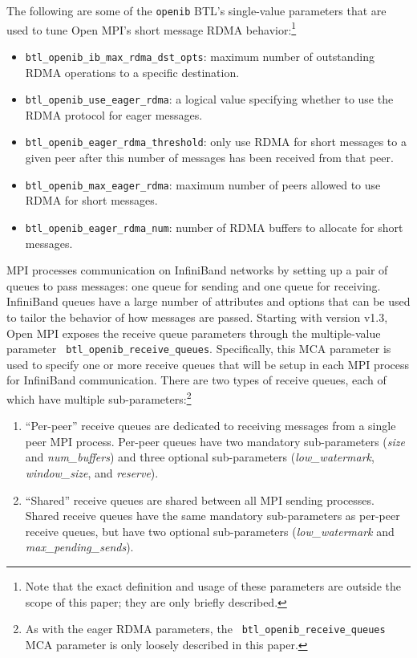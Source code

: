 The following are some of the {\tt openib} BTL's single-value
parameters that are used to tune Open MPI's short message RDMA
behavior:\footnote{Note that the exact definition and usage of these
  parameters are outside the scope of this paper; they are only
  briefly described.}

\begin{itemize}
\item {\tt btl\_\-openib\_\-ib\_\-max\_\-rdma\_\-dst\_\-opts}: maximum
  number of outstanding RDMA operations to a specific destination.
\item {\tt btl\_\-openib\_\-use\_\-eager\_\-rdma}: a logical value
  specifying whether to use the RDMA protocol for eager messages.
\item {\tt btl\_\-openib\_\-eager\_\-rdma\_\-threshold}: only use RDMA
  for short messages to a given peer after this number of messages has
  been received from that peer.
\item {\tt btl\_\-openib\_\-max\_\-eager\_\-rdma}: maximum number of
  peers allowed to use RDMA for short messages.
\item {\tt btl\_\-openib\_\-eager\_\-rdma\_\-num}: number of RDMA
  buffers to allocate for short messages.
\end{itemize}

MPI processes communication on InfiniBand networks by setting up a
pair of queues to pass messages: one queue for sending and one queue
for receiving.  InfiniBand queues have a large number of attributes
and options that can be used to tailor the behavior of how messages
are passed.  Starting with version v1.3, Open MPI exposes the receive
queue parameters through the multiple-value parameter {\tt
  btl\_\-openib\_\-receive\_\-queues}.  Specifically, this MCA
parameter is used to specify one or more receive queues that will be
setup in each MPI process for InfiniBand communication.  There are two
types of receive queues, each of which have multiple
sub-parameters:\footnote{As with the eager RDMA parameters, the {\tt
    btl\_\-openib\_\-receive\_\-queues} MCA parameter is only loosely
  described in this paper.}

\begin{enumerate}
\item ``Per-peer'' receive queues are dedicated to receiving messages
  from a single peer MPI process. Per-peer queues have two mandatory
  sub-parameters ({\em size} and {\em num\_\-buffers}) and three
  optional sub-parameters ({\em low\_\-watermark}, {\em
    window\_\-size}, and {\em reserve}).

\item ``Shared'' receive queues are shared between all MPI sending
  processes. Shared receive queues have the same mandatory
  sub-parameters as per-peer receive queues, but have two optional
  sub-parameters ({\em low\_\-watermark} and {\em
    max\_\-pending\_\-sends}).
\end{enumerate}

